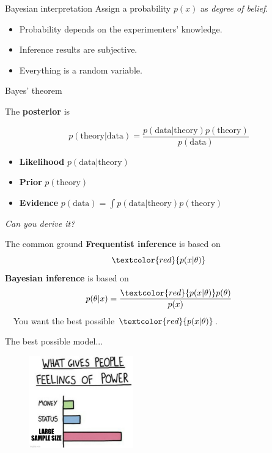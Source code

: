 \documentclass[
aspectratio=169,
14pt,
professionalfonts
]{beamer}
\newcommand{\arrow}{~\ding{220}~}
\begin{document}
\begin{frame}{Bayesian interpretation}
Assign a probability $p(x)$ as \textit{degree of belief}.

\begin{itemize}
    \item Probability depends on the experimenters' knowledge.
    \item Inference results are subjective.
    \item Everything is a random variable.
\end{itemize}
\end{frame}

\begin{frame}{Bayes' theorem}

The \textbf{posterior} is

$$p(\text{theory} | \text{data}) = \frac{p(\text{data}|\text{theory}) p(\text{theory})}{p(\text{data})}$$

\begin{itemize}
    \item \textbf{Likelihood} $p(\text{data}|\text{theory})$
    \item \textbf{Prior} $p(\text{theory})$
    \item \textbf{Evidence} $p(\text{data}) = \int p(\text{data}|\text{theory}) p(\text{theory})$
\end{itemize}
\begin{flushright}
    \textit{Can you derive it?}
\end{flushright}
\end{frame}

\begin{frame}{The common ground}
    \textbf{Frequentist inference} is based on 
    $$\textcolor{red}{p(x|\theta)}$$
    \textbf{Bayesian inference} is based on
    $$p(\theta | x) = \frac{\textcolor{red}{p(x|\theta)} p(\theta)}{p(x)}$$
    \arrow You want the best possible $\textcolor{red}{p(x|\theta)}$.
\end{frame}

\begin{frame}[noframenumbering]{The best possible model...}
    \begin{figure}
        \includegraphics[width=0.4\textwidth]{../plots/sample_size.jpg}
    \end{figure}
\end{frame}
\end{document}
